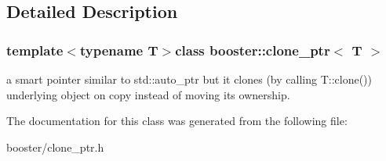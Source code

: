\subsection{\-Detailed \-Description}
\subsubsection*{template$<$typename T$>$class booster\-::clone\-\_\-ptr$<$ T $>$}

a smart pointer similar to std\-::auto\-\_\-ptr but it clones (by calling \-T\-::clone()) underlying object on copy instead of moving its ownership. 

\-The documentation for this class was generated from the following file\-:\begin{DoxyCompactItemize}
\item 
booster/clone\-\_\-ptr.\-h\end{DoxyCompactItemize}
